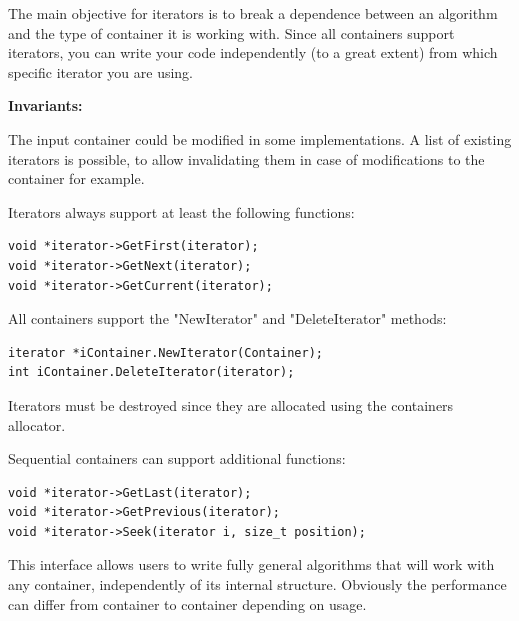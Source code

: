 \documentclass[12pt,a4paper]{memoir} %
\newcommand{\Const}{
{\par\noindent \textbf{Invariants:}\noindent}
}
\begin{document}
The main objective for iterators is to break a dependence between an algorithm and the type of container it is working with. Since all containers
support iterators, you can write your code independently (to a great extent) from which specific iterator you are using.
\Const The input container could be modified in some implementations. A list of existing iterators is possible, to allow invalidating them in case of
modifications to the container for example.

Iterators always support at least the following functions:
\begin{verbatim}
void *iterator->GetFirst(iterator);
void *iterator->GetNext(iterator);
void *iterator->GetCurrent(iterator);
\end{verbatim}
All containers support the "NewIterator"  and "DeleteIterator" methods:
\begin{verbatim}
iterator *iContainer.NewIterator(Container); 
int iContainer.DeleteIterator(iterator);
\end{verbatim}
Iterators must be destroyed since they are allocated using the containers allocator.

Sequential containers can support additional functions:
\begin{verbatim}
void *iterator->GetLast(iterator);
void *iterator->GetPrevious(iterator);
void *iterator->Seek(iterator i, size_t position);
\end{verbatim}
This interface allows users to write fully general algorithms that will work with any container, independently of its internal structure. Obviously the 
performance can differ from container to container depending on usage.
\end{document}
